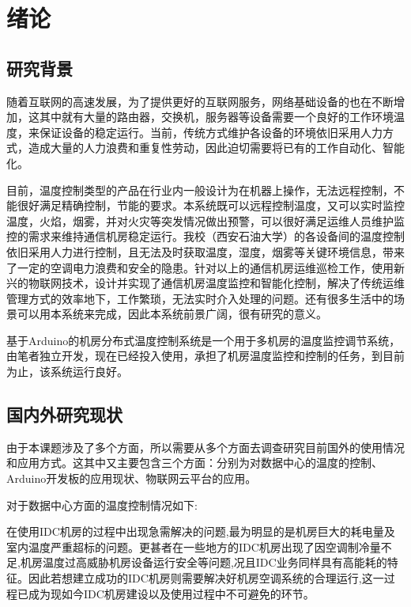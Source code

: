 \section{绪论}

\subsection{研究背景}

随着互联网的高速发展，为了提供更好的互联网服务，网络基础设备的也在不断增加，这其中就有大量的路由器，交换机，服务器等设备需要一个良好的工作环境温度，来保证设备的稳定运行。当前，传统方式维护各设备的环境依旧采用人力方式，造成大量的人力浪费和重复性劳动，因此迫切需要将已有的工作自动化、智能化。

目前，温度控制类型的产品在行业内一般设计为在机器上操作，无法远程控制，不能很好满足精确控制，节能的要求。本系统既可以远程控制温度，又可以实时监控温度，火焰，烟雾，并对火灾等突发情况做出预警，可以很好满足运维人员维护监控的需求来维持通信机房稳定运行。我校（西安石油大学）的各设备间的温度控制依旧采用人力进行控制，且无法及时获取温度，湿度，烟雾等关键环境信息，带来了一定的空调电力浪费和安全的隐患。针对以上的通信机房运维巡检工作，使用新兴的物联网技术，设计并实现了通信机房温度监控和智能化控制，解决了传统运维管理方式的效率地下，工作繁琐，无法实时介入处理的问题。还有很多生活中的场景可以用本系统来完成，因此本系统前景广阔，很有研究的意义。

基于Arduino的机房分布式温度控制系统是一个用于多机房的温度监控调节系统，由笔者独立开发，现在已经投入使用，承担了机房温度监控和控制的任务，到目前为止，该系统运行良好。

\subsection{国内外研究现状}

由于本课题涉及了多个方面，所以需要从多个方面去调查研究目前国外的使用情况和应用方式。这其中又主要包含三个方面：分别为对数据中心的温度的控制、Arduino开发板的应用现状、物联网云平台的应用。

对于数据中心方面的温度控制情况如下:

在使用IDC机房的过程中出现急需解决的问题,最为明显的是机房巨大的耗电量及室内温度严重超标的问题。更甚者在一些地方的IDC机房出现了因空调制冷量不足,机房温度过高威胁机房设备运行安全等问题,况且IDC业务同样具有高能耗的特征。因此若想建立成功的IDC机房则需要解决好机房空调系统的合理运行,这一过程已成为现如今IDC机房建设以及使用过程中不可避免的环节。

